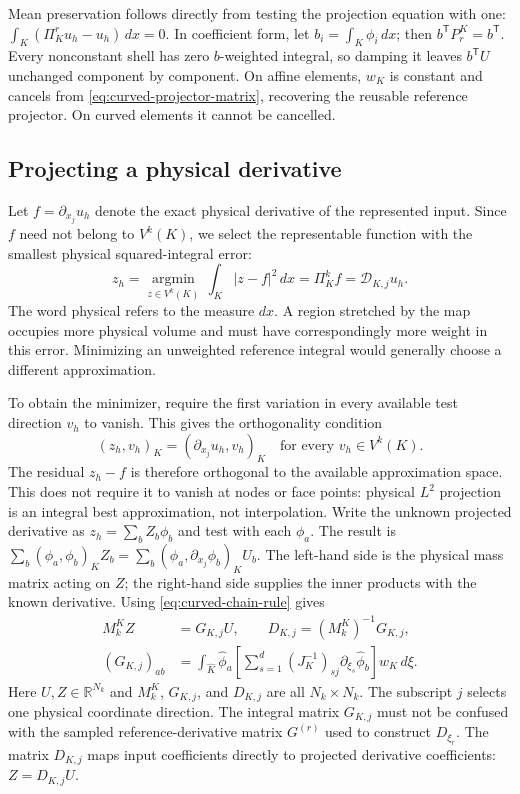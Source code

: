 Mean preservation follows directly from testing the projection equation with
one: $\int_K(\Pi_K^r u_h-u_h)\,dx=0$. In coefficient form, let
$b_i=\int_K\phi_i\,dx$; then $b^{\mathsf T}P_r^K=b^{\mathsf T}$. Every
nonconstant shell has zero $b$-weighted integral, so damping it leaves
$b^{\mathsf T}U$ unchanged component by component. On affine elements,
$w_K$ is constant and cancels from \cref{eq:curved-projector-matrix}, recovering
the reusable reference projector. On curved elements it cannot be cancelled.

\subsection{Projecting a physical derivative}
Let $f=\partial_{x_j}u_h$ denote the exact physical derivative of the
represented input. Since $f$ need not belong to $V^k(K)$, we select the
representable function with the smallest physical squared-integral error:
\begin{equation}
 z_h=\underset{z\in V^k(K)}{\operatorname{argmin}}\,
           \int_K |z-f|^2\,dx
     =\Pi_K^k f=\mathscr D_{K,j}u_h.
 \label{eq:curved-derivative-minimization}
\end{equation}
The word physical refers to the measure $dx$. A region stretched by the
map occupies more physical volume and must have correspondingly more weight
in this error. Minimizing an unweighted reference integral would generally
choose a different approximation.

To obtain the minimizer, require the first variation in every available test
direction $v_h$ to vanish. This gives the orthogonality condition
\begin{equation}
 (z_h,v_h)_K=(\partial_{x_j}u_h,v_h)_K
 \quad\text{for every }v_h\in V^k(K).
 \label{eq:curved-derivative-weak}
\end{equation}
The residual $z_h-f$ is therefore orthogonal to the available approximation
space. This does not require it to vanish at nodes or face points: physical
$L^2$ projection is an integral best approximation, not interpolation.
Write the unknown projected derivative as
$z_h=\sum_b Z_b\phi_b$ and test with each $\phi_a$. The result is
$\sum_b(\phi_a,\phi_b)_K Z_b=
 \sum_b(\phi_a,\partial_{x_j}\phi_b)_K U_b$.
The left-hand side is the physical mass matrix acting on $Z$; the
right-hand side supplies the inner products with the known derivative.
Using \cref{eq:curved-chain-rule} gives
\begin{align}
 M_k^K Z&=G_{K,j}U,\qquad D_{K,j}=(M_k^K)^{-1}G_{K,j},\\
 (G_{K,j})_{ab}&=\int_{\widehat K}\widehat\phi_a
  \left[\sum_{s=1}^d(J_K^{-1})_{sj}
                   \partial_{\xi_s}\widehat\phi_b\right]w_K\,d\xi.
 \label{eq:curved-derivative-assembly}
\end{align}
Here $U,Z\in\mathbb R^{N_k}$ and $M_k^K$, $G_{K,j}$, and $D_{K,j}$
are all $N_k\times N_k$. The subscript $j$ selects one physical coordinate
direction. The integral matrix $G_{K,j}$ must not be confused with the
sampled reference-derivative matrix $G^{(r)}$ used to construct $D_{\xi_r}$.
The matrix $D_{K,j}$ maps input coefficients directly to projected derivative
coefficients: $Z=D_{K,j}U$.

